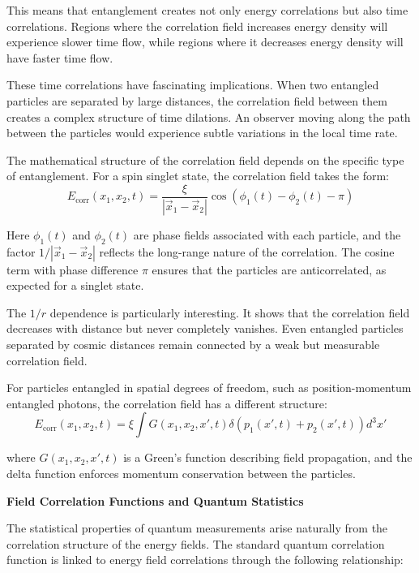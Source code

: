 \documentclass[12pt,a4paper]{article}
\newcommand{\xipar}{\xi}
\theoremstyle{definition}
\theoremstyle{remark}
\begin{document}
This means that entanglement creates not only energy correlations but also time correlations. Regions where the correlation field increases energy density will experience slower time flow, while regions where it decreases energy density will have faster time flow.

These time correlations have fascinating implications. When two entangled particles are separated by large distances, the correlation field between them creates a complex structure of time dilations. An observer moving along the path between the particles would experience subtle variations in the local time rate.

The mathematical structure of the correlation field depends on the specific type of entanglement. For a spin singlet state, the correlation field takes the form:
\begin{equation}
	E_{\text{corr}}(x_1,x_2,t) = \frac{\xipar}{|\vec{x}_1 - \vec{x}_2|} \cos(\phi_1(t) - \phi_2(t) - \pi)
	\label{eq:singlet_correlation}
\end{equation}

Here $\phi_1(t)$ and $\phi_2(t)$ are phase fields associated with each particle, and the factor $1/|\vec{x}_1 - \vec{x}_2|$ reflects the long-range nature of the correlation. The cosine term with phase difference $\pi$ ensures that the particles are anticorrelated, as expected for a singlet state.

The $1/r$ dependence is particularly interesting. It shows that the correlation field decreases with distance but never completely vanishes. Even entangled particles separated by cosmic distances remain connected by a weak but measurable correlation field.

For particles entangled in spatial degrees of freedom, such as position-momentum entangled photons, the correlation field has a different structure:
\begin{equation}
	E_{\text{corr}}(x_1,x_2,t) = \xipar \int G(x_1,x_2,x',t) \delta(p_1(x',t) + p_2(x',t)) d^3x'
	\label{eq:position_momentum_correlation}
\end{equation}

where $G(x_1,x_2,x',t)$ is a Green's function describing field propagation, and the delta function enforces momentum conservation between the particles.

\textbf{Field Correlation Functions and Quantum Statistics}

The statistical properties of quantum measurements arise naturally from the correlation structure of the energy fields. The standard quantum correlation function is linked to energy field correlations through the following relationship:
\end{document}
